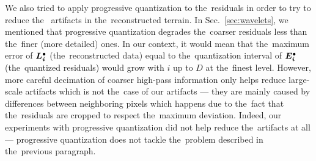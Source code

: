 We also tried to apply progressive quantization to the~residuals in order to try to reduce the~ artifacts in the~reconstructed terrain. In Sec.~\ref{sec:wavelets}, we mentioned that progressive quantization degrades the~coarser residuals less than the~finer (more detailed) ones. In our context, it would mean that the~maximum error of $\objdot{L}{i}$ (the~reconstructed data) equal to the~quantization interval of $\objdot{E}{i}$ (the~quantized residuals) would grow with $i$ up to $D$ at the~finest level. However, more careful decimation of coarser high-pass information only helps reduce large-scale artifacts which is not the~case of our artifacts --- they are mainly caused by differences between neighboring pixels which happens due to the~fact that the~residuals are cropped to respect the~maximum deviation. Indeed, our experiments with progressive quantization did not help reduce the~artifacts at all --- progressive quantization does not tackle the~problem described in the~previous paragraph.